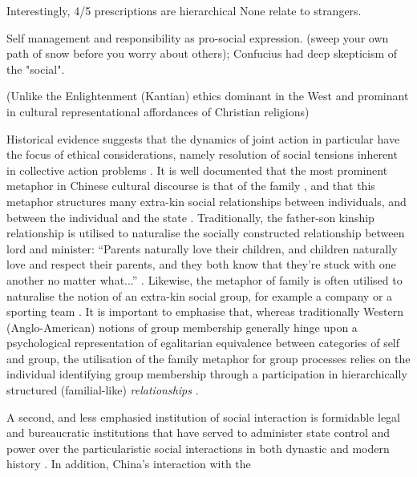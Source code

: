 {Interestingly, 4/5 prescriptions are hierarchical
None relate to strangers.

Self management and responsibility as pro-social expression.  (sweep your own path of snow before you worry about others); Confucius had deep skepticism of the "social".

(Unlike the Enlightenment (Kantian) ethics dominant in the West and prominant in cultural representational affordances of Christian religions)


Historical evidence suggests that the dynamics of joint action in particular have the focus of ethical considerations, namely resolution of social tensions inherent in collective action problems \citep{Slingerland2014}.  It is well documented that the most prominent metaphor in Chinese cultural discourse is that of the family \citep{Maehr1980}, and that this metaphor structures many extra-kin social relationships between individuals, and between the individual and the state \citep{Gold2002}.  Traditionally, the father-son kinship relationship is utilised to naturalise the socially constructed relationship between lord and minister: ``Parents naturally love their children, and children naturally love and respect their parents, and they both know that they're stuck with one another no matter what...'' \citep[178]{Slingerland2014}. Likewise, the metaphor of family is often utilised to naturalise the notion of an extra-kin social group, for example a company or a sporting team \citep{Brownell2008}.
It is important to emphasise that, whereas traditionally Western (Anglo-American) notions of group membership generally hinge upon a psychological representation of egalitarian equivalence between categories of self and group, the utilisation of the family metaphor for group processes relies on the individual identifying group membership through a participation in hierarchically structured (familial-like) \textit{relationships} \citep{Fei1992}.



A second, and less emphasied institution of social interaction is   formidable legal and bureaucratic institutions that have served to administer state control and power over the particularistic social interactions in both dynastic and modern history \citep[]{Liu2017}.  In addition, China's interaction with the

}
